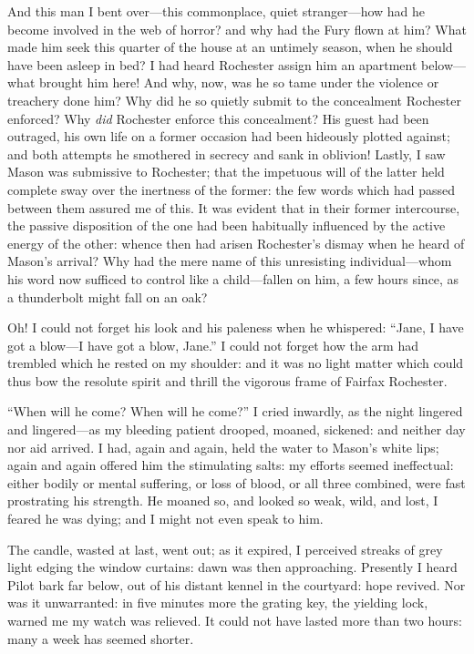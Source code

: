And this man I bent over---this commonplace, quiet stranger---how had he
become involved in the web of horror? and why had the Fury flown at
him? What made him seek this quarter of the house at an untimely
season, when he should have been asleep in bed? I had heard \Mr{}
Rochester assign him an apartment below---what brought him here! And
why, now, was he so tame under the violence or treachery done him? Why
did he so quietly submit to the concealment \Mr{} Rochester enforced? Why
\emph{did} \Mr{} Rochester enforce this concealment? His guest had been
outraged, his own life on a former occasion had been hideously plotted
against; and both attempts he smothered in secrecy and sank in
oblivion! Lastly, I saw \Mr{} Mason was submissive to \Mr{} Rochester; that
the impetuous will of the latter held complete sway over the inertness
of the former: the few words which had passed between them assured me of
this. It was evident that in their former intercourse, the passive
disposition of the one had been habitually influenced by the active
energy of the other: whence then had arisen \Mr{} Rochester's dismay when
he heard of \Mr{} Mason's arrival? Why had the mere name of this
unresisting individual---whom his word now sufficed to control like a
child---fallen on him, a few hours since, as a thunderbolt might fall on
an oak?

Oh! I could not forget his look and his paleness when he whispered:
\enquote{Jane, I have got a blow---I have got a blow, Jane.} I could
not forget how the arm had trembled which he rested on my shoulder: and
it was no light matter which could thus bow the resolute spirit and
thrill the vigorous frame of Fairfax Rochester.

\enquote{When will he come? When will he come?} I cried inwardly, as
the night lingered and lingered---as my bleeding patient drooped,
moaned, sickened: and neither day nor aid arrived. I had, again and
again, held the water to Mason's white lips; again and again offered him
the stimulating salts: my efforts seemed ineffectual: either bodily or
mental suffering, or loss of blood, or all three combined, were fast
prostrating his strength. He moaned so, and looked so weak, wild, and
lost, I feared he was dying; and I might not even speak to him.

The candle, wasted at last, went out; as it expired, I perceived streaks
of grey light edging the window curtains: dawn was then approaching.
Presently I heard Pilot bark far below, out of his distant kennel in the
courtyard: hope revived. Nor was it unwarranted: in five minutes more
the grating key, the yielding lock, warned me my watch was relieved. It
could not have lasted more than two hours: many a week has seemed
shorter.

